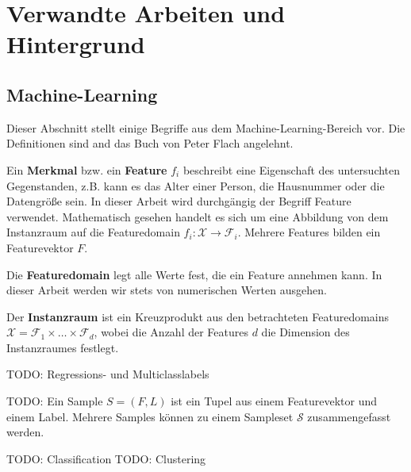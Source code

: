 

\section{Verwandte Arbeiten und Hintergrund}
	
\subsection{Machine-Learning}
Dieser Abschnitt stellt einige Begriffe aus dem Machine-Learning-Bereich vor. Die Definitionen sind and das Buch von Peter Flach \cite{Flach:2012:MLA:2490546} angelehnt.

Ein \textbf{Merkmal} bzw. ein \textbf{Feature} $f_i$ beschreibt eine Eigenschaft des untersuchten Gegenstanden, z.B. kann es das Alter einer Person, die Hausnummer oder die Datengröße sein. In dieser Arbeit wird durchgängig der Begriff Feature verwendet. Mathematisch gesehen handelt es sich um eine Abbildung von dem Instanzraum auf die Featuredomain $f_i : \mathscr{X} \rightarrow \mathscr{F}_i$. Mehrere Features bilden ein Featurevektor $F$. 

Die \textbf{Featuredomain} legt alle Werte fest, die ein Feature annehmen kann. In dieser Arbeit werden wir stets von numerischen Werten ausgehen.

Der \textbf{Instanzraum} ist ein Kreuzprodukt aus den betrachteten Featuredomains $\mathscr{X} = \mathscr{F}_1 \times \dots \times \mathscr{F}_d$, wobei die Anzahl der Features $d$ die Dimension des Instanzraumes festlegt.

TODO: Regressions- und Multiclasslabels

TODO: Ein Sample $S = (F, L)$ ist ein Tupel aus einem Featurevektor und einem Label. Mehrere Samples können zu einem Sampleset $\mathcal{S}$ zusammengefasst werden.

TODO: Classification
TODO: Clustering

